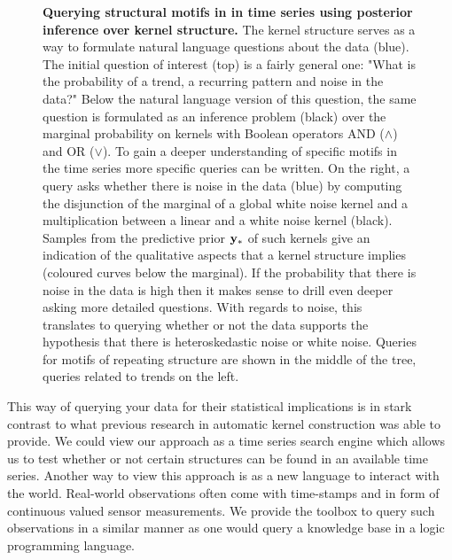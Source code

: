 \begin{figure}
\centering

\caption{{\bf Querying structural motifs in in time series using posterior inference
over kernel structure.} The kernel structure serves as a way to formulate
natural language questions about the data (blue). The initial question of interest
(top) is a fairly
general one: "What is the probability of a trend, a recurring
pattern and noise in the data?" Below the natural language version of this
question, the same question is formulated as an inference problem (black) over the
marginal probability on kernels with Boolean operators AND ($\land$) and OR ($\lor$). 
To gain  a deeper understanding of specific motifs in the time series more specific queries can
be written.
On the right, a query asks whether there is noise in the data (blue) by computing the disjunction of the marginal
of a global white noise kernel and a multiplication between a linear and a white
noise kernel (black). Samples from the predictive prior $\mathbf{y}_*$ of such kernels give an
indication of the qualitative aspects that a kernel structure implies (coloured curves below
the marginal). 
If the probability that there is noise in the data is high then it makes sense
to drill even deeper asking more detailed questions. With regards to noise, this
translates to querying whether or not the data supports the hypothesis that there is
heteroskedastic noise or white noise. Queries for motifs of repeating structure
are shown in the middle of the tree, queries related to trends on the left.}\label{fig:query}
\end{figure}
This way of querying your data for their statistical implications is in stark contrast to what previous research in automatic kernel construction was able to provide.
We could view our approach as a time series search engine which allows us to test whether or not certain structures can be found
in an available time series.
Another way to view this approach is as a new language to interact with the world.
Real-world observations often come with time-stamps and in form
of continuous valued sensor measurements.  
We provide the toolbox to query such observations in a similar manner as
one would query a knowledge base in a logic programming language.






